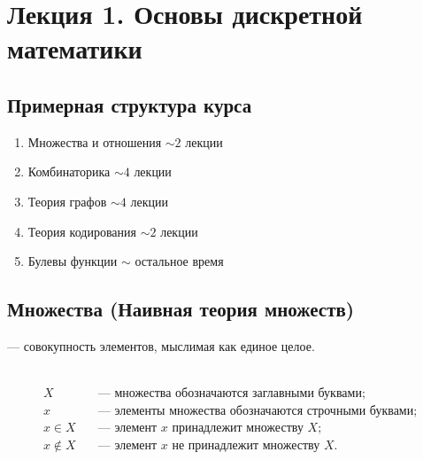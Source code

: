 \section{Лекция 1. Основы дискретной математики}

\subsection*{Примерная структура курса}

\begin{enumerate}
    \item Множества и отношения \hfill $\sim 2$ лекции
    \item Комбинаторика \hfill $\sim 4$ лекции
    \item Теория графов \hfill $\sim 4$ лекции
    \item Теория кодирования \hfill $\sim 2$ лекции
    \item Булевы функции \hfill $\sim$ остальное время
\end{enumerate}

\subsection{Множества (Наивная теория множеств)}

\begin{definition}
     --- совокупность элементов, мыслимая как единое 
    целое.
\end{definition}

\begin{designation} ~
    \begin{align*}
        X \quad &\text{--- множества обозначаются заглавными буквами;} \\
        x \quad &\text{--- элементы множества обозначаются строчными буквами;} \\
        x \in X \quad &\text{--- элемент } x \text{ принадлежит множеству } X; \\
        x \notin X \quad &\text{--- элемент } x \text{ не принадлежит множеству } X.
    \end{align*}
\end{designation}

